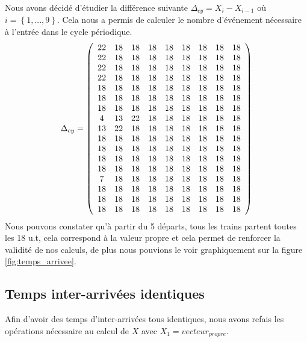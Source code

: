 Nous avons décidé d'étudier la différence suivante $\Delta_{cy} = X_i - X_{i-1}$ où $i = \left\lbrace 1,...,9\right\rbrace$. Cela nous a permis de calculer le nombre d'événement nécessaire à l'entrée dans le cycle périodique.
\begin{equation}
\Delta_{cy} = 
\left(
\begin{array}{cc cc cc cc cc}
22 & 18 & 18 & 18 & 18 & 18 & 18 & 18 & 18 \\
22 & 18 & 18 & 18 & 18 & 18 & 18 & 18 & 18 \\
22 & 18 & 18 & 18 & 18 & 18 & 18 & 18 & 18 \\
22 & 18 & 18 & 18 & 18 & 18 & 18 & 18 & 18 \\
18 & 18 & 18 & 18 & 18 & 18 & 18 & 18 & 18 \\
18 & 18 & 18 & 18 & 18 & 18 & 18 & 18 & 18 \\
18 & 18 & 18 & 18 & 18 & 18 & 18 & 18 & 18 \\
4 &  13 & 22 & 18 & 18 & 18 & 18 & 18 & 18 \\
13 & 22 & 18 & 18 & 18 & 18 & 18 & 18 & 18 \\
18 & 18 & 18 & 18 & 18 & 18 & 18 & 18 & 18 \\
18 & 18 & 18 & 18 & 18 & 18 & 18 & 18 & 18 \\
18 & 18 & 18 & 18 & 18 & 18 & 18 & 18 & 18 \\
18 & 18 & 18 & 18 & 18 & 18 & 18 & 18 & 18 \\
7 &  18 & 18 & 18 & 18 & 18 & 18 & 18 & 18 \\
18 & 18 & 18 & 18 & 18 & 18 & 18 & 18 & 18 \\
18 & 18 & 18 & 18 & 18 & 18 & 18 & 18 & 18 \\
18 & 18 & 18 & 18 & 18 & 18 & 18 & 18 & 18 
\end{array}
\right)
\end{equation}
Nous pouvons constater qu'à partir du  5\ieme{} départs, tous les trains partent toutes les 18 u.t, cela correspond à la valeur propre et cela permet de renforcer la validité de nos calculs, de plus nous pouvions le voir graphiquement sur la figure \ref{fig:temps_arrivee}.

\subsection{Temps inter-arrivées identiques}
Afin d'avoir des temps d'inter-arrivées tous identiques, nous avons refais les opérations nécessaire au calcul de $X$ avec $X_1=vecteur_{propre}$.


